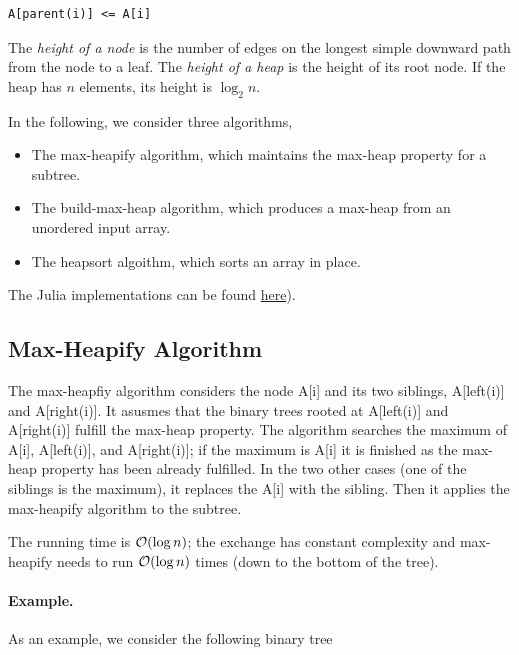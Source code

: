 \begin{verbatim}
A[parent(i)] <= A[i]
\end{verbatim}


The \emph{height of a node} is the number of edges on the longest simple downward path from the node to a leaf. The \emph{height of a heap} is the height of its root node. If the heap has $n$ elements, its height is $\log_2 n$.

In the following, we consider three algorithms,

\begin{itemize}
\item The max-heapify algorithm, which maintains the max-heap property for a subtree.
\item The build-max-heap algorithm, which produces a max-heap from an unordered input array.
\item The heapsort algoithm, which sorts an array in place.
\end{itemize}

The Julia implementations can be found \href{https://github.com/ClemensFMN/JuliaStuff/blob/master/algorithms/heapsort.jl}{here}).

\subsection{Max-Heapify Algorithm}

The max-heapfiy algorithm considers the node A[i] and its two siblings, A[left(i)] and A[right(i)]. It asusmes that the binary trees rooted at A[left(i)] and A[right(i)] fulfill the max-heap property. The algorithm searches the maximum of A[i], A[left(i)], and A[right(i)]; if the maximum is A[i] it is finished as the max-heap property has been already fulfilled. In the two other cases (one of the siblings is the maximum), it replaces the A[i] with the sibling. Then it applies the max-heapify algorithm to the subtree.

The running time is $\mathcal{O}(\log n)$; the exchange has constant complexity and max-heapify needs to run $\mathcal{O}(\log n)$ times (down to the bottom of the tree).

\paragraph{Example.} As an example, we consider the following binary tree

